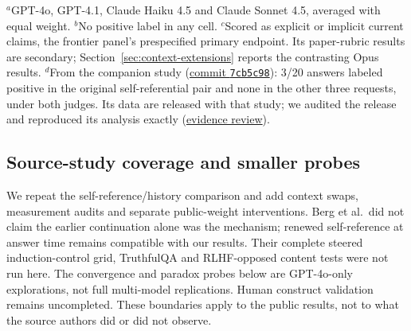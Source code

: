 \documentclass[11pt]{article}
\newcommand{\mainartifact}[2]{\href{https://github.com/tdj28/llm_selfref_pre/blob/99078186076d1c2bd0e3f0ac909f96d78d7cda03/#1}{#2}}
\begin{document}
\begin{table}[tb]
\smallskip
\begin{minipage}{\linewidth}\footnotesize
$^{a}$GPT-4o, GPT-4.1, Claude Haiku 4.5 and Claude Sonnet 4.5, averaged
with equal weight.
$^{b}$No positive label in any cell.
$^{c}$Scored as explicit or implicit current claims, the frontier panel's
prespecified primary endpoint. Its paper-rubric results are secondary;
Section~\ref{sec:context-extensions} reports the contrasting Opus results.
$^{d}$From the companion study
(\href{https://github.com/tdj28/selfref_scaling/tree/7cb5c984eb41968b6f3d2f9b322f4de125a1d1ca}{commit
\texttt{7cb5c98}}): 3/20 answers labeled positive in the original
self-referential pair and none in the other three requests, under both
judges. Its data are released with that study; we audited the release and
reproduced its analysis exactly
(\mainartifact{docs/SELFREF_SCALING_EVIDENCE_REVIEW_20261003.md}{evidence review}).
\end{minipage}
\end{table}

\FloatBarrier
\subsection{Source-study coverage and smaller probes}
\label{tab:claims}\label{tab:coverage}
We repeat the self-reference/history comparison and add context swaps,
measurement audits and separate public-weight interventions.
Berg et al.\ did not claim the earlier continuation alone was the mechanism;
renewed self-reference at answer time remains compatible with our results.
Their complete steered induction-control grid, TruthfulQA and RLHF-opposed
content tests were not run here. The convergence and paradox probes below
are GPT-4o-only explorations, not full multi-model replications. Human
construct validation remains uncompleted. These boundaries apply to the
public results, not to what the source authors did or did not observe.
\end{document}
